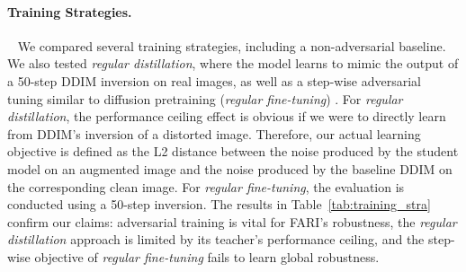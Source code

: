 \documentclass{article}
\begin{document}
\paragraph{Training Strategies.}~ We compared several training strategies, including a non-adversarial baseline. We also tested \textit{regular distillation}, where the model learns to mimic the output of a 50-step DDIM inversion on real images, as well as a step-wise adversarial tuning similar to diffusion pretraining (\textit{regular fine-tuning}) \citep{ddpm_2020}. 
For \textit{regular distillation}, the performance ceiling effect is obvious if we were to directly learn from DDIM's inversion of a distorted image. Therefore, our actual learning objective is defined as the L2 distance between the noise produced by the student model on an augmented image and the noise produced by the baseline DDIM on the corresponding clean image.
For \textit{regular fine-tuning}, the evaluation is conducted using a 50-step inversion.
The results in Table~\ref{tab:training_stra} confirm our claims: adversarial training is vital for FARI's robustness, the \textit{regular distillation} approach is limited by its teacher's performance ceiling, and the step-wise objective of \textit{regular fine-tuning} fails to learn global robustness.


\begin{table}[ht]
  \centering
  \begin{minipage}[b]{0.48\linewidth}
    \centering
    \caption{The Performance of FARI on different trained modules.}
    \label{tab:trained_mod}
    
  \end{minipage}
  \hfill
  \begin{minipage}[b]{0.48\linewidth}
    \centering
    \caption{The Performance of FARI on different training strategies.}
    \label{tab:training_stra}
    
  \end{minipage}
\end{table}
\end{document}
